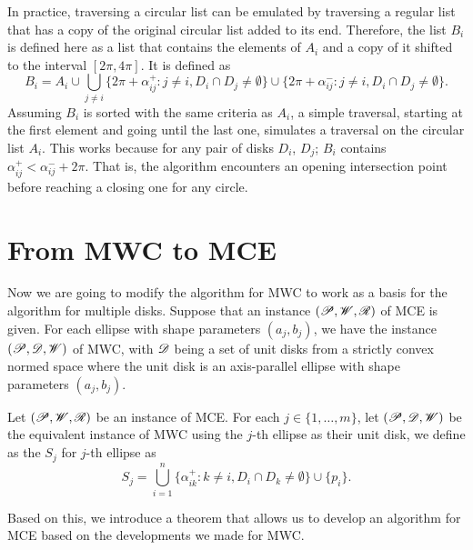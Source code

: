 In practice, traversing a circular list can be emulated by traversing a regular list that has a copy of the original circular list added to its end. 
Therefore, the list $B_i$ is defined here as a list that contains the elements of $A_i$ and a copy of it shifted to the interval $[2\pi, 4\pi]$. It is defined as
\begin{equation}\label{eq:bi2}
B_i = A_i\cup\bigcup_{j\neq i} \{2\pi+\alpha_{ij}^+ \colon j\neq i, D_i \cap D_j \neq \emptyset\} \cup \{2\pi+\alpha_{ij}^- \colon j\neq i, D_i \cap D_j \neq \emptyset \}.
\end{equation}
Assuming $B_i$ is sorted with the same criteria as $A_i$, a simple traversal, starting at the first element and going until the last one, simulates a traversal on the circular list $A_i$.
This works because for any pair of disks $D_i$, $D_j$; $B_i$ contains $\alpha_{ij}^+ < \alpha_{ij}^- + 2\pi$. That is, the algorithm encounters an opening intersection point before reaching a closing one for any circle.

\section{From MWC to MCE}

Now we are going to modify the algorithm for MWC to work as a basis for the algorithm for multiple disks.
Suppose that an instance $(\mathscr{P}, \mathscr{W}, \mathscr{R})$ of MCE is given. For each ellipse with shape parameters $(a_j, b_j)$, we have the instance $(\mathscr{P}, \mathscr{D}, \mathscr{W})$ of MWC, with $\mathscr{D}$ being a set of unit disks from a strictly convex normed space where the unit disk is an axis-parallel ellipse with shape parameters $(a_j, b_j)$.

\begin{definicao}
	Let $(\mathscr{P}, \mathscr{W}, \mathscr{R})$ be an instance of MCE. For each $j \in \{1, \dots, m\}$, let $(\mathscr{P}, \mathscr{D}, \mathscr{W})$ be the equivalent instance of MWC using the $j$-th ellipse as their unit disk, we define as the  $S_j$ for $j$-th ellipse as
	\begin{equation*}
	S_j = \bigcup_{i=1}^n \{\alpha_{ik}^+ \colon k\neq i, D_i \cap D_k \neq \emptyset\}\cup \{p_i\}.
	\end{equation*}
\end{definicao}

Based on this, we introduce a theorem that allows us to develop an algorithm for MCE based on the developments we made for MWC.

